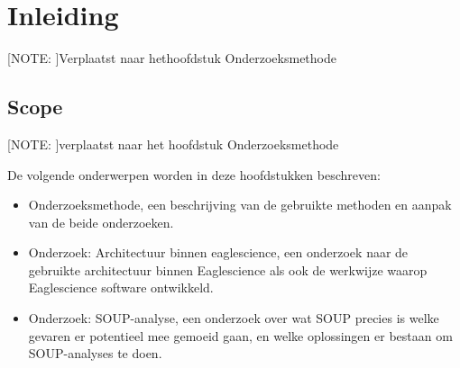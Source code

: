 
\chapter{Inleiding}\label{ch:inleiding3} %


\label{inOnderzoek} %

[NOTE: ]Verplaatst naar hethoofdstuk Onderzoeksmethode



\section{Scope}\label{sec:scope}
[NOTE: ]verplaatst naar het hoofdstuk Onderzoeksmethode

De volgende onderwerpen worden in deze hoofdstukken beschreven:
\begin{itemize}
    \item Onderzoeksmethode, een beschrijving van de gebruikte methoden en aanpak van de beide onderzoeken.
    \item Onderzoek: Architectuur binnen eaglescience, een onderzoek naar de gebruikte architectuur binnen Eaglescience als ook de werkwijze waarop Eaglescience software ontwikkeld.
    \item Onderzoek: SOUP-analyse, een onderzoek over wat SOUP precies is welke gevaren er potentieel mee gemoeid gaan, en welke oplossingen er bestaan om SOUP-analyses te doen.
\end{itemize}
